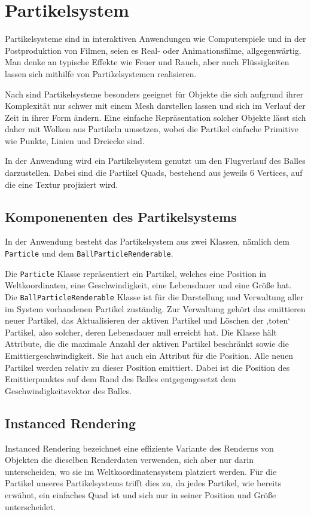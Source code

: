 \section{Partikelsystem}
\label{Kapitel_2_-_Unterkapitel_2}
%
Partikelsysteme sind in interaktiven Anwendungen wie Computerspiele und in der Postproduktion von Filmen, seien es Real- oder Animationsfilme, allgegenwärtig.
Man denke an typische Effekte wie Feuer und Rauch, aber auch Flüssigkeiten lassen sich mithilfe von Partikelsystemen realisieren.

Nach \cite{reeves:particle_systems} sind Partikelsysteme besonders geeignet für Objekte die sich aufgrund ihrer Komplexität nur schwer mit einem Mesh darstellen lassen und sich im Verlauf der Zeit in ihrer Form ändern. Eine einfache Repräsentation solcher Objekte lässt sich daher mit Wolken aus Partikeln umsetzen, wobei die Partikel einfache Primitive wie Punkte, Linien und Dreiecke sind\cite{reeves:particle_systems}.

In der Anwendung wird ein Partikelsystem genutzt um den Flugverlauf des Balles darzustellen. Dabei sind die Partikel Quads, bestehend aus jeweils 6 Vertices, auf die eine Textur projiziert wird.

\subsection{Komponenenten des Partikelsystems}
\label{Kapitel_2_-_Unterkapitel_2.1}
%
In der Anwendung besteht das Partikelsystem aus zwei Klassen, nämlich dem {\texttt{Particle}} und dem {\texttt{BallParticleRenderable}}.

Die {\texttt{Particle}} Klasse repräsentiert ein Partikel, welches eine Position in Weltkoordinaten, eine Geschwindigkeit, eine Lebensdauer und eine Größe hat. 
Die {\texttt{BallParticleRenderable}} Klasse ist für die Darstellung und Verwaltung aller im System vorhandenen Partikel zuständig. Zur Verwaltung gehört das emittieren neuer Partikel, das Aktualisieren der aktiven Partikel und Löschen der ‚toten‘ Partikel, also solcher, deren Lebensdauer null erreicht hat. Die Klasse hält Attribute, die die maximale Anzahl der aktiven Partikel beschränkt sowie die Emittiergeschwindigkeit.  Sie hat auch ein Attribut für die Position. Alle neuen Partikel werden relativ zu dieser Position emittiert. Dabei ist die Position des Emittierpunktes auf dem Rand des Balles entgegengesetzt dem Geschwindigkeitsvektor des Balles.

\subsection{Instanced Rendering}
\label{Kapitel_2_-_Unterkapitel_2.2}
%
Instanced Rendering bezeichnet eine effiziente Variante des Renderns von Objekten die dieselben Renderdaten verwenden, sich aber nur darin unterscheiden, wo sie im Weltkoordinatensystem platziert werden. Für die Partikel unseres Partikelsystems trifft dies zu, da jedes Partikel, wie bereits erwähnt, ein einfaches Quad ist und sich nur in seiner Position und Größe unterscheidet.

